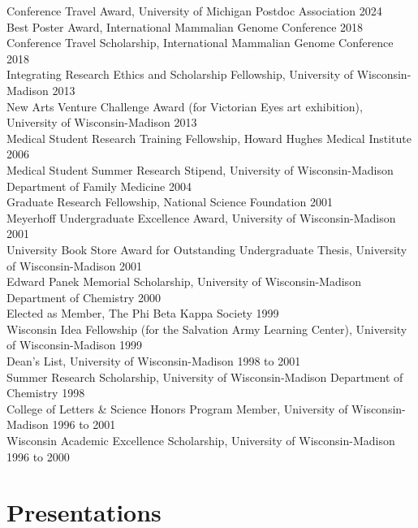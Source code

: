 \documentclass[
  10pt,
]
{article}
\begin{document}
\normalsize Conference Travel Award, University of Michigan Postdoc
Association \hfill 2024\\
\normalsize Best Poster Award, International Mammalian Genome Conference
\hfill 2018\\
\normalsize Conference Travel Scholarship, International Mammalian
Genome Conference \hfill 2018\\
\normalsize Integrating Research Ethics and Scholarship Fellowship,
University of Wisconsin-Madison \hfill 2013\\
\normalsize New Arts Venture Challenge Award (for Victorian Eyes art
exhibition), University of Wisconsin-Madison \hfill 2013\\
\normalsize Medical Student Research Training Fellowship, Howard Hughes
Medical Institute \hfill 2006\\
\normalsize Medical Student Summer Research Stipend, University of
Wisconsin-Madison Department of Family Medicine \hfill 2004\\
\normalsize Graduate Research Fellowship, National Science Foundation
\hfill 2001\\
\normalsize Meyerhoff Undergraduate Excellence Award, University of
Wisconsin-Madison \hfill 2001\\
\normalsize University Book Store Award for Outstanding Undergraduate
Thesis, University of Wisconsin-Madison \hfill 2001\\
\normalsize Edward Panek Memorial Scholarship, University of
Wisconsin-Madison Department of Chemistry \hfill 2000\\
\normalsize Elected as Member, The Phi Beta Kappa Society \hfill 1999\\
\normalsize Wisconsin Idea Fellowship (for the Salvation Army Learning
Center), University of Wisconsin-Madison \hfill 1999\\
\normalsize Dean's List, University of Wisconsin-Madison \hfill 1998 to
2001\\
\normalsize Summer Research Scholarship, University of Wisconsin-Madison
Department of Chemistry \hfill 1998\\
\normalsize College of Letters \& Science Honors Program Member,
University of Wisconsin-Madison \hfill 1996 to 2001\\
\normalsize Wisconsin Academic Excellence Scholarship, University of
Wisconsin-Madison \hfill 1996 to 2000

\section{Presentations}\label{presentations}
\end{document}
